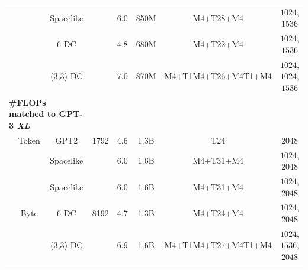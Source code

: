 \begin{table}[t!]
{\begin{tabular}{lccccccc}
\cellcolor{Green7!10}{H-Net (space)} & & Spacelike & & 6.0 & 850M & \colorbox{EncDec0}{M4}+\colorbox{Main}{T28}+\colorbox{EncDec0}{M4} & \colorbox{EncDec0}{$1024$}, \colorbox{Main}{$1536$}\\
\cellcolor{Orange7!10}{\model{} (\onestage{})} & & 6-DC & & 4.8 & 680M & \colorbox{EncDec0}{M4}+\colorbox{Main}{T22}+\colorbox{EncDec0}{M4} & \colorbox{EncDec0}{$1024$}, \colorbox{Main}{$1536$}\\
\cellcolor{Red7!10}{\model{} (\twostage{})} & & (3,3)-DC & & 7.0 & 870M & \colorbox{EncDec0}{M4}+\colorbox{EncDec1}{T1M4}+\colorbox{Main}{T26}+\colorbox{EncDec1}{M4T1}+\colorbox{EncDec0}{M4} & \colorbox{EncDec0}{$1024$}, \colorbox{EncDec1}{$1024$}, \colorbox{Main}{$1536$}\\
\midrule
\multicolumn{3}{l}{\quad \textbf{\#FLOPs matched to GPT-3 \textit{XL}}}\\
\cellcolor{Gray7!20}{Transformer} & {Token} & {GPT2} & {1792} & 4.6 & 1.3B & \colorbox{Main}{T24} & \colorbox{Main}{$2048$}\\
\addlinespace[-0.15em]
\cmidrule{1-8}
\addlinespace[-0.25em]
\cellcolor{Cyan7!10}{SpaceByte++} & & Spacelike & & 6.0 & 1.6B & \colorbox{EncDec0}{M4}+\colorbox{Main}{T31}+\colorbox{EncDec0}{M4} & \colorbox{EncDec0}{$1024$}, \colorbox{Main}{$2048$}\\
\cellcolor{Green7!10}{H-Net (space)} & & Spacelike & & 6.0 & 1.6B & \colorbox{EncDec0}{M4}+\colorbox{Main}{T31}+\colorbox{EncDec0}{M4} & \colorbox{EncDec0}{$1024$}, \colorbox{Main}{$2048$}\\
\cellcolor{Orange7!10}{\model{} (\onestage{})} & \multirow{-2}{*}{Byte} & 6-DC & \multirow{-2}{*}{8192} & 4.7 & 1.3B & \colorbox{EncDec0}{M4}+\colorbox{Main}{T24}+\colorbox{EncDec0}{M4} & \colorbox{EncDec0}{$1024$}, \colorbox{Main}{$2048$}\\
\cellcolor{Red7!10}{\model{} (\twostage{})} & & (3,3)-DC & & 6.9 & 1.6B & \colorbox{EncDec0}{M4}+\colorbox{EncDec1}{T1M4}+\colorbox{Main}{T27}+\colorbox{EncDec1}{M4T1}+\colorbox{EncDec0}{M4} & \colorbox{EncDec0}{$1024$}, \colorbox{EncDec1}{$1536$}, \colorbox{Main}{$2048$}\\
\bottomrule
\end{tabular}
} 
\label{tab: architecture}
\end{table}
